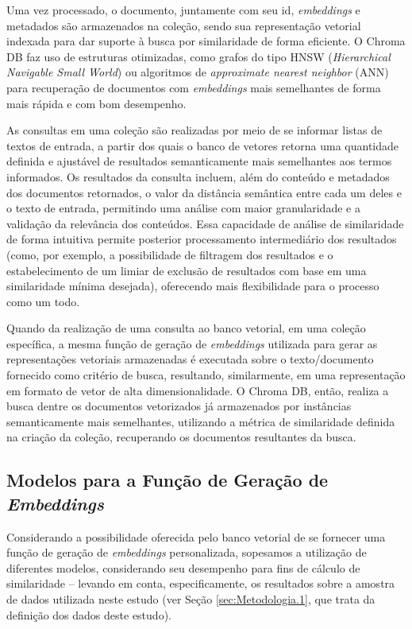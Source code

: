Uma vez processado, o documento, juntamente com seu  id, \textit{embeddings} e metadados são armazenados na coleção, sendo sua representação vetorial indexada para dar suporte à busca por similaridade de forma eficiente. O Chroma DB faz uso de estruturas otimizadas, como grafos do tipo HNSW (\textit{Hierarchical Navigable Small World}) ou algoritmos de \textit{approximate nearest neighbor} (ANN) para recuperação de documentos com \textit{embeddings} mais semelhantes de forma mais rápida e com bom desempenho.

As consultas em uma coleção são realizadas por meio de se informar listas de textos de entrada, a partir dos quais o banco de vetores retorna uma quantidade definida e ajustável de resultados semanticamente mais semelhantes aos termos informados. Os resultados da consulta incluem, além do conteúdo e metadados dos documentos retornados, o valor  da distância semântica entre cada um deles e o texto de entrada, permitindo uma análise com maior granularidade e a validação da relevância dos conteúdos. Essa capacidade de análise de similaridade de forma intuitiva permite posterior processamento intermediário dos resultados (como, por exemplo, a possibilidade de filtragem dos resultados e o estabelecimento de um limiar de exclusão de resultados com base em uma similaridade mínima desejada), oferecendo mais flexibilidade para o processo como um todo.

Quando da realização de uma consulta ao banco vetorial, em uma coleção específica, a mesma função de geração de \textit{embeddings} utilizada para gerar as representações vetoriais armazenadas é executada sobre o texto/documento fornecido como critério de busca, resultando, similarmente, em uma representação em formato de vetor de alta dimensionalidade. O Chroma DB, então, realiza a busca dentre os documentos vetorizados já armazenados por instâncias semanticamente mais semelhantes, utilizando a métrica de similaridade definida na criação da coleção, recuperando os documentos resultantes da busca.

\subsection{Modelos para a Função de Geração de \textit{Embeddings}}
\label{subsec:Assistente.1.2}

Considerando a possibilidade oferecida pelo banco vetorial de se fornecer uma função de geração de \textit{embeddings} personalizada, sopesamos a utilização de diferentes modelos, considerando seu desempenho para fins de cálculo de similaridade -- levando em conta, especificamente, os resultados sobre a amostra de dados utilizada neste estudo (ver Seção \ref{sec:Metodologia.1}, que trata da definição dos dados deste estudo).

